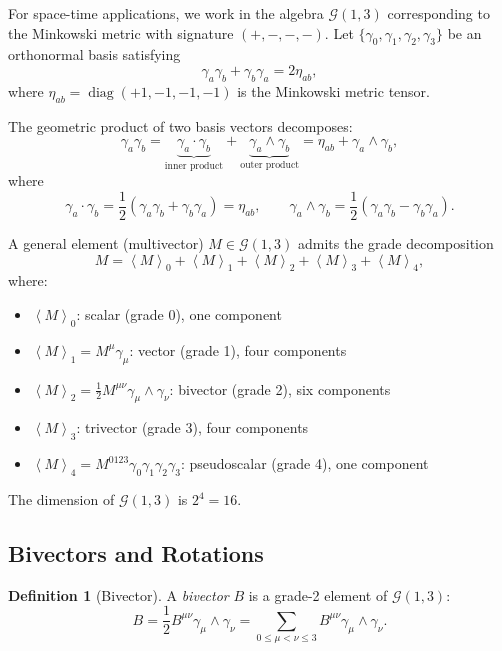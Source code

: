 \documentclass[11pt,a4paper]{article}
\numberwithin{equation}{section}
\theoremstyle{plain}
\theoremstyle{definition}
\newtheorem{definition}[theorem]{Definition}
\theoremstyle{remark}
\newcommand{\Cl}{\mathcal{G}}               %
\newcommand{\grade}[2]{\left\langle #1 \right\rangle_{#2}}
\newcommand{\scal}[1]{\grade{#1}{0}}       %
\newcommand{\vecp}[1]{\grade{#1}{1}}       %
\newcommand{\biv}[1]{\grade{#1}{2}}        %
\newcommand{\triv}[1]{\grade{#1}{3}}       %
\DeclareMathOperator{\diag}{diag}
\begin{document}
For space-time applications, we work in the algebra $\Cl(1,3)$ corresponding to the Minkowski metric with signature $(+,-,-,-)$. Let $\{\gamma_0, \gamma_1, \gamma_2, \gamma_3\}$ be an orthonormal basis satisfying
\begin{equation}
\gamma_a \gamma_b + \gamma_b \gamma_a = 2\eta_{ab},
\label{eq:basis-anticommutation}
\end{equation}
where $\eta_{ab} = \diag(+1,-1,-1,-1)$ is the Minkowski metric tensor.

The geometric product of two basis vectors decomposes:
\begin{equation}
\gamma_a \gamma_b = \underbrace{\gamma_a \cdot \gamma_b}_{\text{inner product}} + \underbrace{\gamma_a \wedge \gamma_b}_{\text{outer product}} = \eta_{ab} + \gamma_a \wedge \gamma_b,
\label{eq:product-decomposition}
\end{equation}
where
\begin{equation}
\gamma_a \cdot \gamma_b = \frac{1}{2}(\gamma_a\gamma_b + \gamma_b\gamma_a) = \eta_{ab},
\qquad
\gamma_a \wedge \gamma_b = \frac{1}{2}(\gamma_a\gamma_b - \gamma_b\gamma_a).
\end{equation}

A general element (multivector) $M \in \Cl(1,3)$ admits the grade decomposition
\begin{equation}
M = \scal{M} + \vecp{M} + \biv{M} + \triv{M} + \grade{M}{4},
\end{equation}
where:
\begin{itemize}
\item $\scal{M}$: scalar (grade 0), one component
\item $\vecp{M} = M^\mu \gamma_\mu$: vector (grade 1), four components
\item $\biv{M} = \frac{1}{2}M^{\mu\nu}\gamma_\mu \wedge \gamma_\nu$: bivector (grade 2), six components
\item $\triv{M}$: trivector (grade 3), four components
\item $\grade{M}{4} = M^{0123}\gamma_0\gamma_1\gamma_2\gamma_3$: pseudoscalar (grade 4), one component
\end{itemize}

The dimension of $\Cl(1,3)$ is $2^4 = 16$.

\subsection{Bivectors and Rotations}

\begin{definition}[Bivector]
A \emph{bivector} $B$ is a grade-2 element of $\Cl(1,3)$:
\begin{equation}
B = \frac{1}{2}B^{\mu\nu}\gamma_\mu \wedge \gamma_\nu = \sum_{0 \le \mu < \nu \le 3} B^{\mu\nu}\gamma_\mu \wedge \gamma_\nu.
\label{eq:bivector-def}
\end{equation}
\end{definition}
\end{document}
